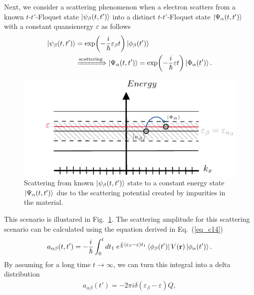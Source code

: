 Next, we consider a scattering phenomenon when a electron scatters from a known $t$-$t'$-Floquet state $\ket{\psi_{\beta}(t,t')} $ into a distinct $t$-$t'$-Floquet state $\ket{\Psi_{\alpha}(t,t')}$ with a constant quansienergy $\varepsilon$ as follows
\begin{equation} \label{eq_c15}
  \begin{aligned}
  \ket{\psi_{\beta}(t,t')} &= \exp(-\frac{i}{\hbar}\varepsilon_{\beta} t)
  \ket{\phi_{\beta}(t')} \\
  &
  \xRightarrow{\text{scattering}}
  \ket{\Psi_{\alpha}(t,t')} = \exp(-\frac{i}{\hbar}\varepsilon t)
  \ket{\Phi_{\alpha}(t')}.
  \end{aligned}
\end{equation}
\begin{figure}[b]
  \includegraphics[scale=1.0]{figures/fig_2.pdf}
  \caption{Scattering from known $\ket{\psi_{\beta}(t,t')}$ state to a constant energy state $\ket{\Psi_{\alpha}(t,t')}$ due to the scattering potential created by impurities in the material.}
  \label{fig_2}
\end{figure}
This scenario is illustared in Fig.~\ref{fig_2}.
The scattering amplitude for this scattering scenario can be calculated using the equation derived in Eq.~(\ref{eq_c14})
\begin{equation} \label{eq_c16}
  \begin{aligned}
    a_{\alpha\beta}(t,t') =
    -\frac{i}{\hbar}
    \int_{0}^t dt_1 \;
    e^{\frac{i}{\hbar}\qty(\varepsilon_{\beta} - \varepsilon)t_1}
    \bra{\phi_{\beta}(t')}
    V(\vb{r}) \ket{\phi_{\alpha}(t')}.
  \end{aligned}
\end{equation}
By assuming for a long time $t \rightarrow \infty$, we can turn this integral into a delta distribution
\begin{equation} \label{eq_c17}
  \begin{aligned}
    a_{\alpha\beta}(t') =
    -2\pi i \delta(\varepsilon_{\beta} - \varepsilon)Q,
  \end{aligned}
\end{equation}
